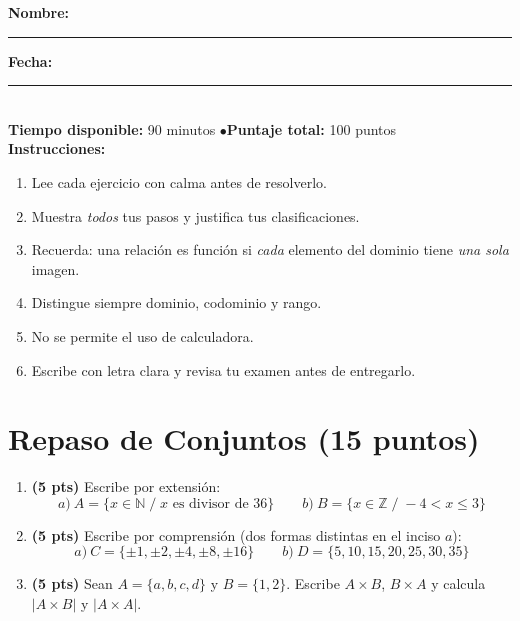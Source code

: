 \documentclass[12pt, letterpaper]{article}
\newcommand{\N}{\mathbb{N}}
\newcommand{\Z}{\mathbb{Z}}
\begin{document}


\vspace{4pt}
\begin{cuadroinfo}
  \small
  \textbf{Nombre:} \rule{0.55\linewidth}{0.4pt} \quad \textbf{Fecha:} \rule{0.15\linewidth}{0.4pt} \\[6pt]
  \textbf{Tiempo disponible:} 90 minutos \quad$\bullet$\quad \textbf{Puntaje total:} 100 puntos \\[4pt]
  \textbf{Instrucciones:}
  \begin{enumerate}[leftmargin=*]
    \item Lee cada ejercicio con calma antes de resolverlo.
    \item Muestra \emph{todos} tus pasos y justifica tus clasificaciones.
    \item Recuerda: una relación es función si \emph{cada} elemento del dominio tiene \emph{una sola} imagen.
    \item Distingue siempre dominio, codominio y rango.
    \item No se permite el uso de calculadora.
    \item Escribe con letra clara y revisa tu examen antes de entregarlo.
  \end{enumerate}
\end{cuadroinfo}

\vspace{8pt}

\section{Repaso de Conjuntos (15 puntos)}

\begin{enumerate}[leftmargin=*]
  \item \textbf{(5 pts)} Escribe por extensión:
        \[
          a)\ A = \{x \in \N \;/\; x \text{ es divisor de } 36\} \qquad
          b)\ B = \{x \in \Z \;/\; -4 < x \leq 3\}
        \]

  \item \textbf{(5 pts)} Escribe por comprensión (dos formas distintas en el inciso $a$):
        \[
          a)\ C = \{\pm 1, \pm 2, \pm 4, \pm 8, \pm 16\} \qquad
          b)\ D = \{5, 10, 15, 20, 25, 30, 35\}
        \]

  \item \textbf{(5 pts)} Sean $A = \{a, b, c, d\}$ y $B = \{1, 2\}$. Escribe $A \times B$, $B \times A$ y calcula $|A \times B|$ y $|A \times A|$.
\end{enumerate}
\end{document}
